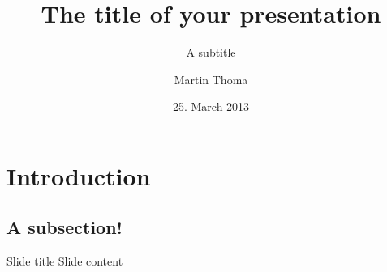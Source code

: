 \documentclass{beamer}
\begin{document}
\title{The title of your presentation}
\subtitle{A subtitle}
\author{Martin Thoma}
\date{25. March 2013}
\subject{Computer Science}

\frame{\titlepage}

\section{Introduction}
\subsection{A subsection!}
\begin{frame}{Slide title}
    Slide content
\end{frame}
\end{document}

